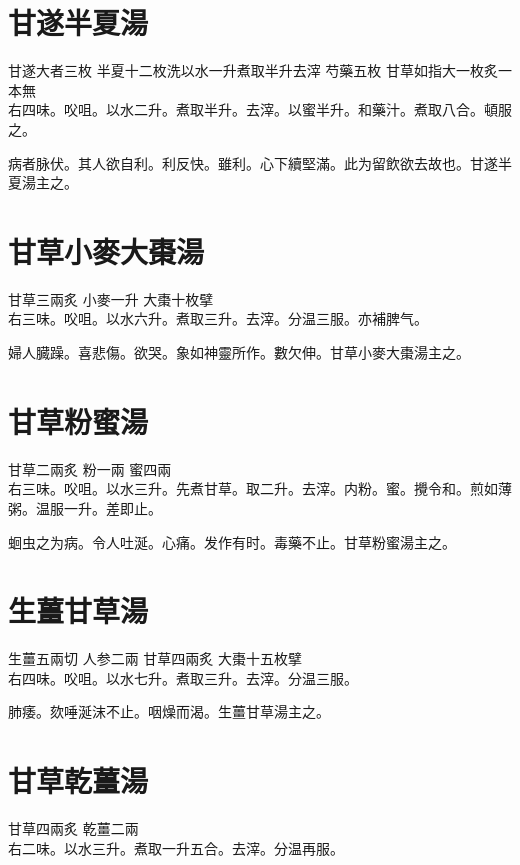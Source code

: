 \section{甘遂半夏湯}

甘遂{\scriptsize 大者三枚} 半夏{\scriptsize 十二枚洗以水一升煮取半升去滓} 芍藥{\scriptsize 五枚} 甘草{\scriptsize 如指大一枚炙一本無}\\
右四味。㕮咀。以水二升。煮取半升。去滓。以蜜半升。和藥汁。煮取八合。頓服之。

病者脉伏。其人欲自利。利反快。雖利。心下續堅滿。此为留飲欲去故也。甘遂半夏湯主之。

\section{甘草小麥大棗湯}

甘草{\scriptsize 三兩炙} 小麥{\scriptsize 一升} 大棗{\scriptsize 十枚擘}\\
右三味。㕮咀。以水六升。煮取三升。去滓。分温三服。亦補脾气。

婦人臓躁。喜悲傷。欲哭。象如神靈所作。數欠伸。甘草小麥大棗湯主之。

\section{甘草粉蜜湯}

甘草{\scriptsize 二兩炙} 粉{\scriptsize 一兩} 蜜{\scriptsize 四兩}\\
右三味。㕮咀。以水三升。先煮甘草。取二升。去滓。内粉。蜜。攪令和。煎如薄粥。温服一升。差即止。

蛔虫之为病。令人吐涎。心痛。发作有时。毒藥不止。甘草粉蜜湯主之。

\section{生薑甘草湯}

生薑{\scriptsize 五兩切} 人参{\scriptsize 二兩} 甘草{\scriptsize 四兩炙} 大棗{\scriptsize 十五枚擘}\\
右四味。㕮咀。以水七升。煮取三升。去滓。分温三服。

肺痿。欬唾涎沫不止。咽燥而渴。生薑甘草湯主之。

\section{甘草乾薑湯}

甘草{\scriptsize 四兩炙} 乾薑{\scriptsize 二兩}\\
右二味。以水三升。煮取一升五合。去滓。分温再服。

